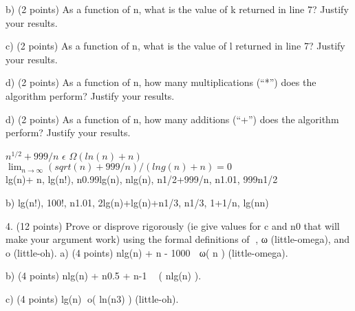 \documentclass[12pt]{article}
\newenvironment{question}[2][Question]{\begin{trivlist}
		\item[\hskip \labelsep {\bfseries #1}\hskip \labelsep {\bfseries #2.}]}{\end{trivlist}}
\begin{document}
	\begin{question}{2b}	
		b) (2 points) As a function of n, what is the value of k returned in line 7? Justify your results.
	\end{question}

	\begin{question}{2c}	
		c) (2 points) As a function of n, what is the value of l returned in line 7? Justify your results.
		\end{question}

\begin{question}{2d}	
		d) (2 points) As a function of n, how many multiplications (“*”) does the algorithm perform? Justify your results.
			\end{question}
	
\begin{question}{2e}	
		d) (2 points) As a function of n, how many additions (“+”) does the algorithm perform? Justify your results.
			\end{question}
	
\begin{question}{3a}
		
$n^{1/2}+999/n$ $\epsilon$ $\Omega(ln(n)+n)$\\

$\lim_{n\to\infty} (sqrt(n) + 999/n)/(lng(n) + n) = 0$\\

lg(n)+ n,	lg(n!),	n0.99lg(n),	nlg(n),	n1/2+999/n,	n1.01,		999n1/2


			\end{question}
	
\begin{question}{3b}	
		b) lg(n!),	100!,	n1.01,	2lg(n)+lg(n)+n1/3,		n1/3,	1+1/n,	 	lg(nn)
			\end{question}
	
\begin{question}{4a}	
		4. (12 points) Prove or disprove rigorously (ie give values for c and n0 that will make your argument work) using the formal definitions of , ω (little-omega), and o (little-oh).
		a) (4 points) nlg(n) + n - 1000  ω( n )  (little-omega).
			\end{question}
	
\begin{question}{4b}	
		b) (4 points) nlg(n) + n0.5 + n-1  ( nlg(n) ).
			\end{question}
	
\begin{question}{4c}	
		c) (4 points) lg(n) o( ln(n3) ) (little-oh).
		
			\end{question}
	
\end{document}
